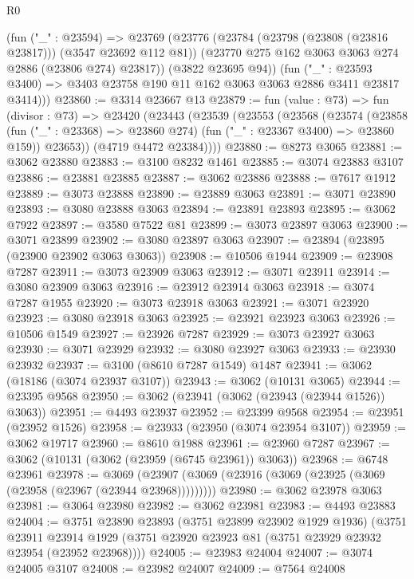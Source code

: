 \begin{lexlean}{R0}
\begin{coremodule}
        (fun ("_" : @23594) =>
        @23769
          (@23776
            (@23784 (@23798 (@23808 (@23816 @23817))) (@3547 @23692 @112 @81))
            (@23770 @275 @162 @3063 @3063 @274 @2886 (@23806 @274) @23817))
          (@3822 @23695 @94))
        (fun ("_" : @23593 @3400) =>
        @3403 @23758 @190 @11 @162 @3063 @3063 @2886 @3411 @23817 @3414)))
@23860 := @3314 @23667 @13
@23879 := fun (value : @73) =>
  fun (divisor : @73) =>
  @23420
    (@23443
      (@23539
        (@23553
          (@23568
            (@23574
              (@23858 (fun ("_" : @23368) => @23860 @274) (fun ("_" : @23367 @3400) => @23860 @159))
              @23653))
          (@4719 @4472 @23384))))
@23880 := @8273 @3065
@23881 := @3062 @23880
@23883 := @3100 @8232 @1461
@23885 := @3074 @23883 @3107
@23886 := @23881 @23885
@23887 := @3062 @23886
@23888 := @7617 @1912
@23889 := @3073 @23888
@23890 := @23889 @3063
@23891 := @3071 @23890
@23893 := @3080 @23888 @3063
@23894 := @23891 @23893
@23895 := @3062 @7922
@23897 := @3580 @7522 @81
@23899 := @3073 @23897 @3063
@23900 := @3071 @23899
@23902 := @3080 @23897 @3063
@23907 := @23894 (@23895 (@23900 @23902 @3063 @3063))
@23908 := @10506 @1944
@23909 := @23908 @7287
@23911 := @3073 @23909 @3063
@23912 := @3071 @23911
@23914 := @3080 @23909 @3063
@23916 := @23912 @23914 @3063
@23918 := @3074 @7287 @1955
@23920 := @3073 @23918 @3063
@23921 := @3071 @23920
@23923 := @3080 @23918 @3063
@23925 := @23921 @23923 @3063
@23926 := @10506 @1549
@23927 := @23926 @7287
@23929 := @3073 @23927 @3063
@23930 := @3071 @23929
@23932 := @3080 @23927 @3063
@23933 := @23930 @23932
@23937 := @3100 (@8610 @7287 @1549) @1487
@23941 := @3062 (@18186 (@3074 @23937 @3107))
@23943 := @3062 (@10131 @3065)
@23944 := @23395 @9568
@23950 := @3062 (@23941 (@3062 (@23943 (@23944 @1526)) @3063))
@23951 := @4493 @23937
@23952 := @23399 @9568
@23954 := @23951 (@23952 @1526)
@23958 := @23933 (@23950 (@3074 @23954 @3107))
@23959 := @3062 @19717
@23960 := @8610 @1988
@23961 := @23960 @7287
@23967 := @3062 (@10131 (@3062 (@23959 (@6745 @23961)) @3063))
@23968 := @6748 @23961
@23978 := @3069 (@23907 (@3069 (@23916 (@3069 (@23925 (@3069 (@23958 (@23967 (@23944 @23968)))))))))
@23980 := @3062 @23978 @3063
@23981 := @3064 @23980
@23982 := @3062 @23981
@23983 := @4493 @23883
@24004 := @3751
    @23890
    @23893
    (@3751 @23899 @23902 @1929 @1936)
    (@3751
      @23911
      @23914
      @1929
      (@3751 @23920 @23923 @81 (@3751 @23929 @23932 @23954 (@23952 @23968))))
@24005 := @23983 @24004
@24007 := @3074 @24005 @3107
@24008 := @23982 @24007
@24009 := @7564 @24008

\end{coremodule}
\end{lexlean}
